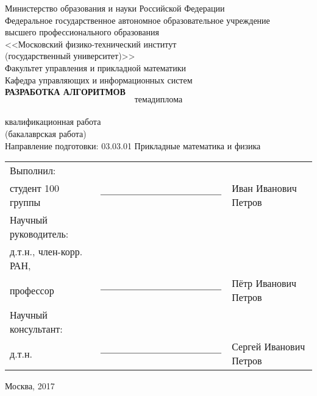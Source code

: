 \begin{center} 

Министерство образования и науки Российской Федерации\\[0.5cm] 
Федеральное государственное автономное образовательное учреждение \\
высшего профессионального образования \\
<<Московский физико-технический институт \\
(государственный университет)>> \\[0.5cm]
Факультет управления и прикладной математики \\[0.5cm]
Кафедра управляющих и информационных систем \\[2.5cm]

\large \textbf{\MakeUppercase{Разработка алгоритмов \[тема диплома\]}}  \\[0.6cm] %
 квалификационная работа \\
(бакалаврская работа) \\[0.2cm]

Направление подготовки: 03.03.01 Прикладные математика и физика \\[1.5cm]


\end{center} 

\noindent
\begin{tabular}{lp{5cm}l}
Выполнил: & & \\
студент 100 группы & $\rule{5cm}{0.15mm}$ & Иван Иванович Петров \\[0.6cm]
Научный руководитель: & & \\
д.т.н., член-корр. РАН, & & \\
профессор & $\rule{5cm}{0.15mm}$ & Пётр Иванович Петров \\[0.6cm]
Научный консультант: & & \\
д.т.н. & $\rule{5cm}{0.15mm}$ & Сергей Иванович Петров \\
\end{tabular}


\vfill 

\begin{center} 
\large Москва, 2017
\end{center} 

\thispagestyle{empty}